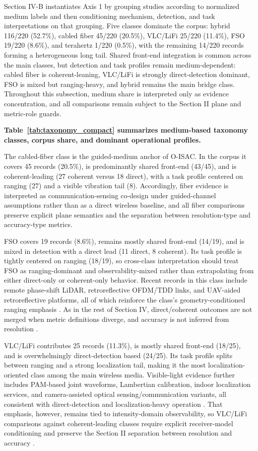 \documentclass[letterpaper,journal]{IEEEtran}
\begin{document}
Section IV-B instantiates Axis 1 by grouping studies according to normalized medium labels and then conditioning mechanism, detection, and task interpretations on that grouping. Five classes dominate the corpus: hybrid 116/220 (52.7\%), cabled fiber 45/220 (20.5\%), VLC/LiFi 25/220 (11.4\%), FSO 19/220 (8.6\%), and terahertz 1/220 (0.5\%), with the remaining 14/220 records forming a heterogeneous long tail. Shared front-end integration is common across the main classes, but detection and task profiles remain medium-dependent: cabled fiber is coherent-leaning, VLC/LiFi is strongly direct-detection dominant, FSO is mixed but ranging-heavy, and hybrid remains the main bridge class. Throughout this subsection, medium share is interpreted only as evidence concentration, and all comparisons remain subject to the Section II plane and metric-role guards.

\textbf{Table~\ref{tab:taxonomy_compact} summarizes medium-based taxonomy classes, corpus share, and dominant operational profiles.}

The cabled-fiber class is the guided-medium anchor of O-ISAC. In the corpus it covers 45 records (20.5\%), is predominantly shared front-end (43/45), and is coherent-leading (27 coherent versus 18 direct), with a task profile centered on ranging (27) and a visible vibration tail (8). Accordingly, fiber evidence is interpreted as communication-sensing co-design under guided-channel assumptions rather than as a direct wireless baseline, and all fiber comparisons preserve explicit plane semantics and the separation between resolution-type and accuracy-type metrics.

FSO covers 19 records (8.6\%), remains mostly shared front-end (14/19), and is mixed in detection with a direct lead (11 direct, 8 coherent). Its task profile is tightly centered on ranging (18/19), so cross-class interpretation should treat FSO as ranging-dominant and observability-mixed rather than extrapolating from either direct-only or coherent-only behavior. Recent records in this class include remote phase-shift LiDAR, retroreflective OFDM/TDD links, and UAV-aided retroreflective platforms, all of which reinforce the class's geometry-conditioned ranging emphasis . As in the rest of Section IV, direct/coherent outcomes are not merged when metric definitions diverge, and accuracy is not inferred from resolution .

VLC/LiFi contributes 25 records (11.3\%), is mostly shared front-end (18/25), and is overwhelmingly direct-detection based (24/25). Its task profile splits between ranging and a strong localization tail, making it the most localization-oriented class among the main wireless media. Visible-light evidence further includes PAM-based joint waveforms, Lambertian calibration, indoor localization services, and camera-assisted optical sensing/communication variants, all consistent with direct-detection and localization-heavy operation . That emphasis, however, remains tied to intensity-domain observability, so VLC/LiFi comparisons against coherent-leading classes require explicit receiver-model conditioning and preserve the Section II separation between resolution and accuracy .
\end{document}
